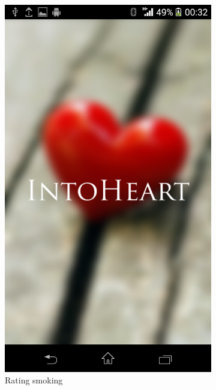 \begin{figure}
\begin{subfigure}{.24\textwidth}
  \includegraphics[width=.8\linewidth]{img/screenshot/ss10.png}
  \caption{Rating smoking}
\end{subfigure}
\begin{subfigure}{.24\textwidth}
  \centering

\end{subfigure}
\end{figure}
